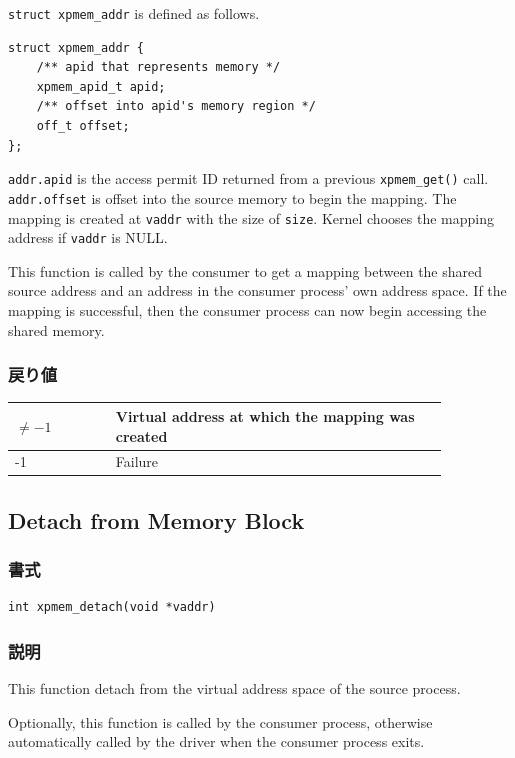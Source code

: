 \documentclass[twoside,11pt,fleqn]{book}
\begin{document}
\texttt{struct xpmem\_addr} is defined as follows.
\begin{verbatim}
struct xpmem_addr {
    /** apid that represents memory */
    xpmem_apid_t apid;
    /** offset into apid's memory region */
    off_t offset;
};
\end{verbatim}

\texttt{addr.apid} is the access permit ID returned from a previous \texttt{xpmem\_get()} call.
\texttt{addr.offset} is offset into the source memory to begin the mapping.
The mapping is created at \texttt{vaddr} with the size of \texttt{size}.
Kernel chooses the mapping address if \texttt{vaddr} is NULL.

This function is called by the consumer to get a mapping between the shared source
address and an address in the consumer process' own address space. If
the mapping is successful, then the consumer process can now begin
accessing the shared memory.

\subsubsection*{戻り値}{\quad}
\begin{table}[!h]
\footnotesize
\begin{tabular}{|p{0.20\linewidth}|p{0.66\linewidth}|} \hline
$\ne -1$&Virtual address at which the mapping was created\\ \hline
-1&Failure\\ \hline
\end{tabular}
\vspace{-0em}
\end{table}
\FloatBarrier

\subsection{Detach from Memory Block}
\subsubsection*{書式}{\quad}
\begin{verbatim}
int xpmem_detach(void *vaddr)
\end{verbatim}
\subsubsection*{説明}{\quad}
This function detach from the virtual address space of the source process.

Optionally, this function is called by the consumer process, otherwise automatically
called by the driver when the consumer process exits.
\end{document}
